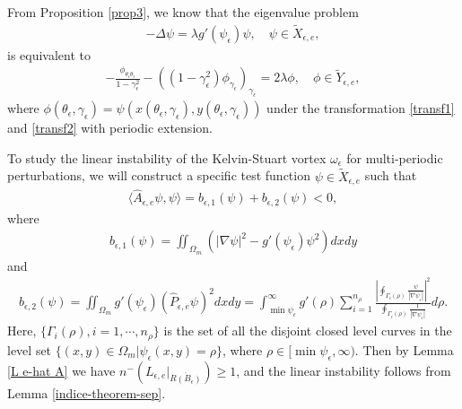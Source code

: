 \documentclass[1 [leqno, 11pt]{amsart}
\numberwithin{equation}{section}
\let\ep=\epsilon
\begin{document}
\begin{CJK*}{GBK}{song}
From Proposition \ref{prop3}, we know that the eigenvalue problem
\begin{align}\label{poisson-eq}
-\Delta \psi = \lambda g'(\psi_\ep) \psi, \quad \psi \in \tilde{X}_{\ep, e},
\end{align}
is equivalent to
\begin{align}\label{poisson-new}
 -\frac{\phi_{\theta_\ep \theta_\ep}}{1-\gamma_\ep^2} - \left( (1-\gamma_\ep^2)\phi_{\gamma_\ep} \right)_{\gamma_\ep} = 2\lambda \phi, \quad \phi \in \tilde{Y}_{\ep, e},
\end{align}
where $\phi(\theta_\ep, \gamma_\ep) = \psi(x(\theta_\ep, \gamma_\ep), y(\theta_\ep, \gamma_\ep))$ under the transformation \eqref{transf1} and \eqref{transf2} with periodic extension.
\fi

 To study the linear instability of the Kelvin-Stuart vortex $\omega_\ep$ for multi-periodic perturbations, we will construct a specific test function $\psi \in \tilde{X}_{\ep, e}$ such that
 \begin{align*}
\langle\hat{A}_{\ep,e} \psi, \psi \rangle=  b_{\ep, 1}(\psi) + b_{\ep, 2}(\psi) < 0,
\end{align*}
where
\begin{align*}
  b_{\ep, 1}(\psi) = \iint_{\Omega_m} \left(|\nabla \psi|^2  - g'(\psi_\ep) \psi^2 \right)dxdy
\end{align*}
and
\begin{align*}
 b_{\ep, 2}(\psi) =  \iint_{\Omega_m} g'(\psi_\ep)( \hat{P}_{\ep,e}\psi)^2 dxdy =  \int_{\min \psi_\ep}^{\infty} g'(\rho) \sum_{i=1}^{n_\rho} \frac{\left|\oint_{\Gamma_i (\rho)} \frac{\psi}{|\nabla \psi_\ep|}\right|^2}{\oint_{\Gamma_i (\rho)} \frac{1}{|\nabla \psi_\ep|}} d\rho.
 \end{align*}
Here,  $\{ \Gamma_i (\rho), i = 1, \cdots, n_\rho\}$ is the set of all the disjoint closed level curves in the level set $\{(x, y)\in \Omega_m |\psi_\ep(x,y) = \rho\}$, where $\rho\in[\min\psi_\ep,\infty)$.
Then  by Lemma \ref{L e-hat A} we have $n^-\left( L_{\ep,e} |_{\overline{R(B_\ep)}} \right) \geq 1$, and the linear instability follows from Lemma \ref{indice-theorem-sep}.


\end{CJK*}
\end{document}
